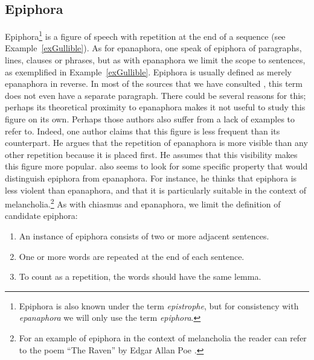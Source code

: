 \subsection{Epiphora}
Epiphora\footnote{Epiphora is also known under the term \emph{epistrophe}, but for consistency with \emph{epanaphora} we will only use the term \emph{epiphora}.} is a figure of speech with repetition at the end of a sequence (see Example~\ref{exGullible}).
%
%
%
\noindent
As for epanaphora, one speak of epiphora of paragraphs, lines, clauses or phrases, but as with epanaphora we limit the scope to sentences, as exemplified in  Example~\ref{exGullible}.
Epiphora is usually defined as merely epanaphora in reverse. In most of the sources that we have consulted \citep{Bacry1992,greene2012,Suhamy2004,gradus,font}, this term does not even have a separate paragraph. There could be several reasons for this; perhaps its theoretical proximity to epanaphora makes it not useful to study this figure on its own. Perhaps those authors also suffer from a lack of examples to refer to. Indeed, one author \citep{Bacry1992} claims that this figure is less frequent than its counterpart. He argues that the repetition of epanaphora is more visible than any other repetition because it is placed first. He assumes that this visibility makes this figure more popular. \cite{Bacry1992} also seems to look for some specific property that would distinguish epiphora from epanaphora. For instance, he thinks that epiphora is less violent than epanaphora, and that it is particularly suitable in the context of melancholia.\footnote{For an example of epiphora in the context of melancholia the reader can refer to the poem ``The Raven'' by Edgar Allan Poe \citep{poe1898raven}.}
As with chiasmus and epanaphora, we limit the definition of candidate epiphora:
\begin{enumerate}
\vspace{0.2cm}
\item An instance of epiphora consists of two or more adjacent sentences.
\item One or more words are repeated at the end of each sentence.
\item To count as a repetition, the words should have the same lemma.
\end{enumerate}


